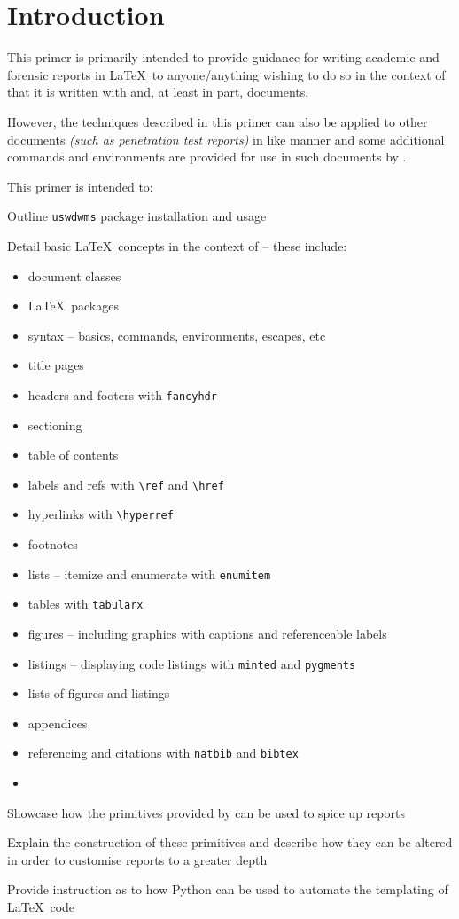 \section{Introduction}
This primer is primarily intended to provide guidance for writing academic and forensic reports in \LaTeX\ to anyone/anything wishing to do so in the context of \uswdwmspkg{} that it is written with and, at least in part, documents.

However, the techniques described in this primer can also be applied to other documents \textit{(such as penetration test reports)} in like manner and some additional commands and environments are provided for use in such documents by \uswdwmspkg{}.

This primer is intended to:
\begin{methodology0}
  \item Outline \texttt{uswdwms} package installation and usage
  \item Detail basic \LaTeX\ concepts in the context of \uswdwmspkg{} -- these include:
    \begin{itemize}
      \item document classes
      \item \LaTeX\ packages
      \item syntax -- basics, commands, environments, escapes, etc
      \item title pages
      \item headers and footers with \texttt{fancyhdr}
      \item sectioning
      \item table of contents
      \item labels and refs with \texttt{\textbackslash ref} and \texttt{\textbackslash href}
      \item hyperlinks with \texttt{\textbackslash hyperref}
      \item footnotes
      \item lists -- itemize and enumerate with \texttt{enumitem}
      \item tables with \texttt{tabularx}
      \item figures -- including graphics with captions and referenceable labels
      \item listings -- displaying code listings with \texttt{minted} and \texttt{pygments}
      \item lists of figures and listings
      \item appendices
      \item referencing and citations with \texttt{natbib} and \texttt{bibtex}
      \item {}
    \end{itemize}
  \item Showcase how the primitives provided by \uswdwmspkg{} can be used to spice up reports
  \item Explain the construction of these primitives and describe how they can be altered in order to customise reports to a greater depth
  \item Provide instruction as to how Python can be used to automate the templating of \LaTeX\ code
\end{methodology0}

